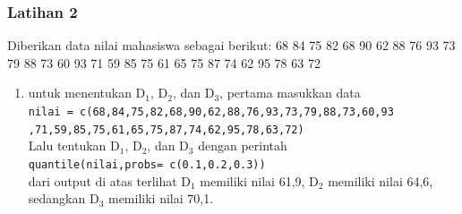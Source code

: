 \documentclass[a4paper,12pt]{article}
\begin{document}
\newpage

\subsubsection{Latihan 2}
Diberikan data nilai mahasiswa sebagai berikut: 68 84 75 82 68 90 62 88 76 93 73 79 88 73 60 93 71 59 85 75 61 65 75 87 74 62 95 78 63 72

\begin{enumerate}[label=\alph*.]
	\item 
	\begin{minipage}[t]{\linewidth}
		\raggedright
	\end{minipage}
	untuk menentukan D$_{1}$, D$_{2}$, dan D$_{3}$, pertama masukkan data\\
	\texttt{nilai = c(68,84,75,82,68,90,62,88,76,93,73,79,88,73,60,93\\
		,71,59,85,75,61,65,75,87,74,62,95,78,63,72)}\\
	Lalu tentukan D$_{1}$, D$_{2}$, dan D$_{3}$ dengan perintah\\
	\texttt{quantile(nilai,probs= c(0.1,0.2,0.3))\\}
	dari output di atas terlihat D$_{1}$ memiliki nilai 61,9, D$_{2}$ memiliki nilai 64,6, sedangkan D$_{3}$ memiliki nilai 70,1.
\end{enumerate}
\end{document}
